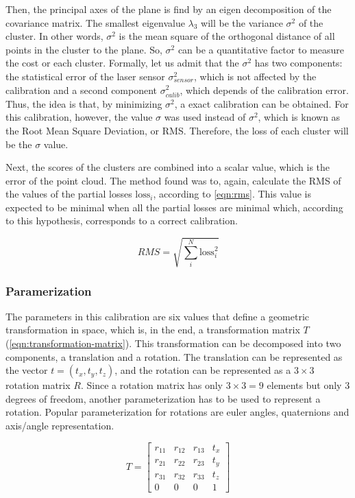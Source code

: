 Then, the principal axes of the plane is find by an eigen decomposition of the covariance matrix. The smallest eigenvalue $\lambda_3$ will be the variance $\sigma^2$ of the cluster. In other words, $\sigma^2$ is the mean square of the orthogonal distance of all points in the cluster to the plane. So, $\sigma^2$ can be a quantitative factor to measure the cost or each cluster. Formally, let us admit that the $\sigma^2$ has two components: the statistical error of the laser sensor $\sigma^2_{sensor}$, which is not affected by the calibration and a second component $\sigma^2_{calib}$, which depends of the calibration error. Thus, the idea is that, by minimizing $\sigma^2$, a exact calibration can be obtained. For this calibration, however, the value $\sigma$ was used instead of $\sigma^2$, which is known as the Root Mean Square Deviation, or RMS. Therefore, the loss of each cluster will be the $\sigma$ value.

Next, the scores of the clusters are combined into a scalar value, which is the error of the point cloud. The method found was to, again, calculate the RMS of the values of the partial losses $\textrm{loss}_i$, according to \cref{eqn:rms}. This value is expected to be minimal when all the partial losses are minimal which, according to this hypothesis, corresponds to a correct calibration.

\begin{equation}
    \label{eqn:rms}
    RMS = \sqrt{\sum_{i}^{N}{\textrm{loss}_i^2}}
\end{equation}

\subsubsection{Paramerization}

The parameters in this calibration are six values that define a geometric transformation in space, which is, in the end, a transformation matrix $T$ (\cref{eqn:transformation-matrix}). This transformation can be decomposed into two components, a translation and a rotation. The translation can be represented as the vector $t = (t_x, t_y, t_z)$, and the rotation can be represented as a $3 \times 3$ rotation matrix $R$. Since a rotation matrix has only $3 \times 3 = 9$ elements but only 3 degrees of freedom, another parameterization has to be used to represent a rotation. Popular parameterization for rotations are euler angles, quaternions and axis/angle representation. 

\begin{equation}
    \label{eqn:transformation-matrix}
    T = \left[
        \begin{array}{cccc}
            r_{11} & r_{12} & r_{13} & t_x \\
            r_{21} & r_{22} & r_{23} & t_y \\
            r_{31} & r_{32} & r_{33} & t_z \\
            0      & 0      & 0      & 1   
        \end{array}
    \right]
\end{equation}

